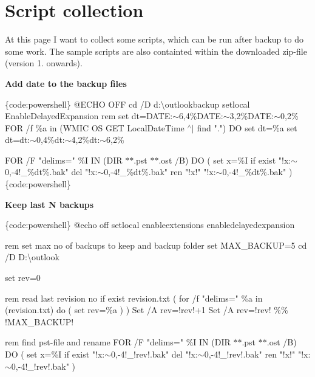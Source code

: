 \chapter{Script collection}
\hypertarget{md__c_1_2_users_2gg_2_documents_2_d_a_d_o_s_2_i_t_e_c-_p_r_o_j_e_c_t_s_2outlookbackupaddin_2docs_2_script_01collection}{}\label{md__c_1_2_users_2gg_2_documents_2_d_a_d_o_s_2_i_t_e_c-_p_r_o_j_e_c_t_s_2outlookbackupaddin_2docs_2_script_01collection}
At this page I want to collect some scripts, which can be run after backup to do some work. The sample scripts are also containted within the downloaded zip-\/file (version 1. onwards).

{\bfseries{Add date to the backup files}}

\{code\+:powershell\} @\+ECHO OFF cd /D d\+:\textbackslash{}outlookbackup setlocal Enable\+Delayed\+Expansion rem set dt=DATE\+:\texorpdfstring{$\sim$}{\string~}6,4\%DATE\+:\texorpdfstring{$\sim$}{\string~}3,2\%DATE\+:\texorpdfstring{$\sim$}{\string~}0,2\% FOR /f \%a in (\textquotesingle{}WMIC OS GET Local\+Date\+Time \texorpdfstring{$^\wedge$}{\string^}\texorpdfstring{$\vert$}{|} find "{}."{}\textquotesingle{}) DO set dt=\%a set dt=dt\+:\texorpdfstring{$\sim$}{\string~}0,4\%dt\+:\texorpdfstring{$\sim$}{\string~}4,2\%dt\+:\texorpdfstring{$\sim$}{\string~}6,2\%

FOR /F "{}delims="{} \%I IN (\textquotesingle{}DIR \texorpdfstring{$\ast$}{*}\texorpdfstring{$\ast$}{*}.pst \texorpdfstring{$\ast$}{*}\texorpdfstring{$\ast$}{*}.ost /B\textquotesingle{}) DO ( set x=\%I if exist "{}!x\+:\texorpdfstring{$\sim$}{\string~}0,-\/4!\+\_\+\%dt\%.\+bak"{} del "{}!x\+:\texorpdfstring{$\sim$}{\string~}0,-\/4!\+\_\+\%dt\%.\+bak"{} ren "{}!x!"{} "{}!x\+:\texorpdfstring{$\sim$}{\string~}0,-\/4!\+\_\+\%dt\%.\+bak"{} ) \{code\+:powershell\}

{\bfseries{Keep last N backups}}

\{code\+:powershell\} @echo off setlocal enableextensions enabledelayedexpansion

rem set max no of backups to keep and backup folder set MAX\+\_\+\+BACKUP=5 cd /D D\+:\textbackslash{}outlook

set rev=0

rem read last revision no if exist revision.\+txt ( for /f "{}delims="{} \%a in (revision.\+txt) do ( set rev=\%a ) ) Set /A rev=!rev!+1 Set /A rev=!rev! \%\% !\+MAX\+\_\+\+BACKUP!

rem find pst-\/file and rename FOR /F "{}delims="{} \%I IN (\textquotesingle{}DIR \texorpdfstring{$\ast$}{*}\texorpdfstring{$\ast$}{*}.pst \texorpdfstring{$\ast$}{*}\texorpdfstring{$\ast$}{*}.ost /B\textquotesingle{}) DO ( set x=\%I if exist "{}!x\+:\texorpdfstring{$\sim$}{\string~}0,-\/4!\+\_\+!rev!.\+bak"{} del "{}!x\+:\texorpdfstring{$\sim$}{\string~}0,-\/4!\+\_\+!rev!.\+bak"{} ren "{}!x!"{} "{}!x\+:\texorpdfstring{$\sim$}{\string~}0,-\/4!\+\_\+!rev!.\+bak"{} )

